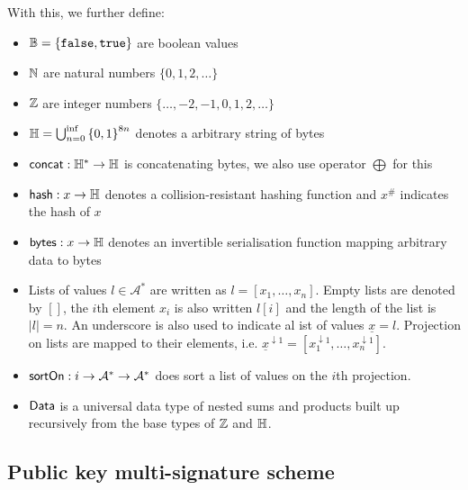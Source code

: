 \noindent With this, we further define:
\begin{itemize}
	\item $\mathbb{B} = \{\mathtt{false}, \mathtt{true}\}$ are boolean values
	\item $\mathbb{N}$ are natural numbers $\{0, 1, 2, \ldots\}$
	\item $\mathbb{Z}$ are integer numbers $\{\ldots, −2, −1, 0, 1, 2, \ldots\}$
	\item $\mathbb{H} = \bigcup_{n=0}^{\inf}{\{0,1\}}^{8n}$ denotes a arbitrary
	      string of bytes
	\item $\mathsf{concat} : \mathbb{H}^* \to \mathbb{H}$ is concatenating bytes, we also use operator $\bigoplus$ for this
	\item $\mathsf{hash} : x \to \mathbb{H}$ denotes a collision-resistant
	      hashing function and $x^{\#}$ indicates the hash of $x$
	\item $\mathsf{bytes} : x \to \mathbb{H}$ denotes an invertible serialisation function
	      mapping arbitrary data to bytes
	\item Lists of values $l \in \mathcal{A}^{*}$ are written as
	      $l = [x_{1}, \ldots, x_{n}]$. Empty lists are denoted by $[]$, the $i$th
	      element $x_{i}$ is also written $l[i]$ and the length of the list is
	      $|l| = n$. An underscore is also used to indicate al ist of values
	      $\underline{x} = l$. Projection on lists are mapped to their elements,
	      i.e.
	      $\underline{x}^{\downarrow1} = [x_{1}^{\downarrow1}, \dots, x_{n}^{\downarrow1}]$.
	\item $\mathsf{sortOn} : i \to \mathcal{A}^{*} \to \mathcal{A}^{*}$ does sort a list of
	      values on the $i$th projection.
	\item $\mathsf{Data}$ is a universal data type of nested sums and products built up
	      recursively from the base types of $\mathbb{Z}$ and $\mathbb{H}$.
\end{itemize}

\subsection{Public key multi-signature scheme}\label{sec:multisig}

